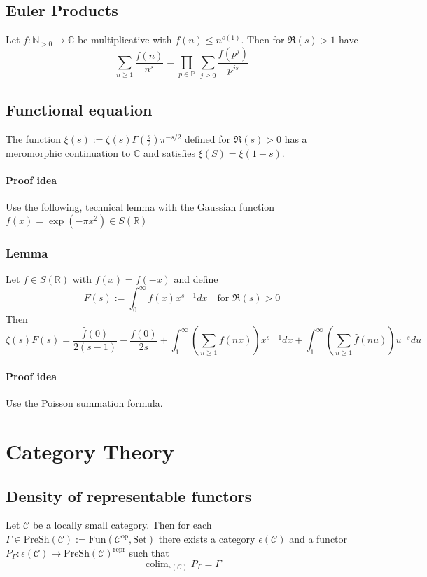 \documentclass{scrartcl}
\newcommand{\R}{\mathbb{R}}
\newcommand{\N}{\mathbb{N}}
\newcommand{\C}{\mathbb{C}}
\DeclareMathOperator*{\colim}{colim}
\begin{document}
\subsection{Euler Products}
Let $f: \N_{>0} \to \C$ be multiplicative with $f(n) \leq n^{o(1)}$. Then for $\Re(s) > 1$ have
\begin{equation*}
    \sum_{n \geq 1} \frac {f(n)} {n^s} = \prod_{p \in \mathbb{P}} \ \sum_{j \geq 0} \frac {f(p^j)} {p^{js}}
\end{equation*}

\subsection{Functional equation}
The function $\xi(s) := \zeta(s)\Gamma(\frac s 2) \pi^{-s/2}$ defined for $\Re(s) > 0$ has a meromorphic continuation to $\C$ and satisfies $\xi(S) = \xi(1 - s)$.
\paragraph{Proof idea} Use the following, technical lemma with the Gaussian function $f(x) = \exp(-\pi x^2) \in S(\R)$ 
\subsubsection*{Lemma}
Let $f \in S(\R)$ with $f(x) = f(-x)$ and define
\begin{equation*}
    F(s) := \int_0^\infty f(x) x^{s - 1} dx \quad \text{for $\Re(s) > 0$}
\end{equation*}
Then
\begin{equation*}
    \zeta(s)F(s) = \frac {\hat{f}(0)} {2(s - 1)} - \frac {f(0)} {2s} + \int_1^\infty \left( \sum_{n \geq 1} f(nx) \right) x^{s - 1} dx + \int_1^\infty \left( \sum_{n \geq 1} \hat{f}(nu) \right) u^{-s} du
\end{equation*}
\paragraph{Proof idea} Use the Poisson summation formula.

\section{Category Theory}

\subsection{Density of representable functors}
Let $\mathcal{C}$ be a locally small category. 
Then for each $\Gamma \in \mathrm{PreSh}(\mathcal{C}) := \mathrm{Fun}(\mathcal{C}^{\mathrm{op}}, \mathrm{Set})$ there exists a category $\epsilon(\mathcal{C})$ and a functor $P_\Gamma: \epsilon(\mathcal{C}) \to \mathrm{PreSh}(\mathcal{C})^{\mathrm{repr}}$ such that
\begin{equation*}
    \colim_{\epsilon(\mathcal{C})} P_\Gamma = \Gamma
\end{equation*}
\end{document}
